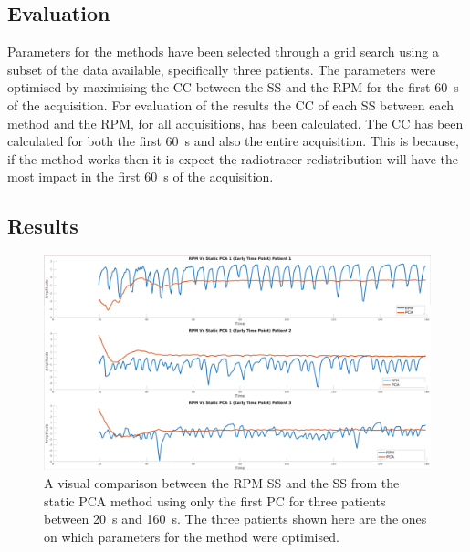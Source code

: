             \subsection{Evaluation} \label{sec:pca_data_driven_surrogate_signal_extraction_methods_for_dynamic_pet_methods_evaluation}
                Parameters for the methods have been selected through a grid search using a subset of the data available, specifically three patients. The parameters were optimised by maximising the \gls{CC} between the \gls{SS} and the \gls{RPM} for the first \SI{60}{\second} of the acquisition. For evaluation of the results the \gls{CC} of each \gls{SS} between each method and the \gls{RPM}, for all acquisitions, has been calculated. The \gls{CC} has been calculated for both the first \SI{60}{\second} and also the entire acquisition. This is because, if the method works then it is expect the radiotracer redistribution will have the most impact in the first \SI{60}{\second} of the acquisition.
            
        \subsection{Results} \label{sec:pca_data_driven_surrogate_signal_extraction_methods_for_dynamic_pet_results}
            \begin{figure}
                \centering
                
                \includegraphics[width=1.0\linewidth]{figures/data_driven_surrogate_signal_extraction_results_1_vanilla_surrogate_signal.png}
                
                \captionsetup{singlelinecheck=false}
                \caption{
                    A visual comparison between the \gls{RPM} \gls{SS} and the \gls{SS} from the static \gls{PCA} method using only the first \gls{PC} for three patients between \SI{20}{\second} and \SI{160}{\second}. The three patients shown here are the ones on which parameters for the method were optimised.
                }
                \label{fig:pca_data_driven_surrogate_signal_extraction_methods_for_dynamic_pet_results_vanilla_surrogate_signal}
            \end{figure}
            
